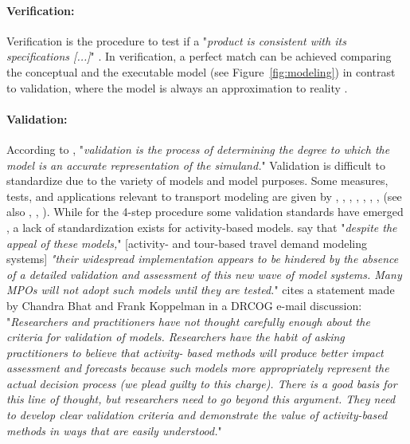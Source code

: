 \paragraph{Verification:}
Verification is the procedure to test if a "\emph{product is consistent with its specifications [...]}" \citet[][p.330]{Petty_SokolowskiBanks_2010}. In verification, a perfect match can be achieved comparing the conceptual and the executable model (see Figure~\ref{fig:modeling}) in contrast to validation, where the model is always an approximation to reality \citep[][p.145]{Kleijnen_EJOR_1995}. 

\paragraph{Validation:}
According to \citet[][p.331]{Petty_SokolowskiBanks_2010}, "\emph{validation is the process of determining the degree to which the model is an accurate representation of the simuland.}" Validation is difficult to standardize due to the variety of models and model purposes. Some measures, tests, and applications relevant to transport modeling are given by \citet[][Table 2]{MilamChao_TRBATPM_2001}, \citet[][]{Lima_TechRep_LMPO_2006}, \citet[][p.155]{KurthEtAl_TRBTDF_2006}, \citet[][p.157]{PendyalaBhat_TRBTDF_2006}, \citet[][p.8]{WegmannEverett_TechRep_CTRUT_2008}, \citet[][]{MilamChao_TRBATPM_2001, RoordaEtAl_TransResA_2008, HawasHameed_TPT_2009, SadekEtAl_TRR_2003, GouliasKitamura_TRR_1992}, \citet[][p.25]{CambridgeSystematics_manual_2008}, \citet[][p.145]{Kleijnen_EJOR_1995} (see also \citet[][]{David_EACSSS_2009}, \citet[][p.56]{SbaytiRoden_ResRep_AASHTO_2010}, \citet[][]{SchifferRossi_TRB_2009}). While for the 4-step procedure some validation standards have emerged \citep[e.g.,][]{BartonAschmanCambridgeSystematics_manual_1997}, a lack of standardization exists for activity-based models. \citet[][]{PendyalaBhat_TRBTDF_2006} say that "\emph{despite the appeal of these models,}" [activity- and tour-based travel demand modeling systems] \emph{"their widespread implementation appears to be hindered by the absence of a detailed validation and assessment of this new wave of model systems. Many MPOs will not adopt such models until they are tested.}" \citet[][]{KurthEtAl_TRBTDF_2006} cites a statement made by Chandra Bhat and Frank Koppelman in a DRCOG e-mail discussion: "\emph{Researchers and practitioners have not thought carefully enough about the criteria for validation of models. Researchers have the habit of asking practitioners to believe that activity- based methods will produce better impact assessment and forecasts because such models more appropriately represent the actual decision process (we plead guilty to this charge). There is a good basis for this line of thought, but researchers need to go beyond this argument. They need to develop clear validation criteria and demonstrate the value of activity-based methods in ways that are easily understood.}"


